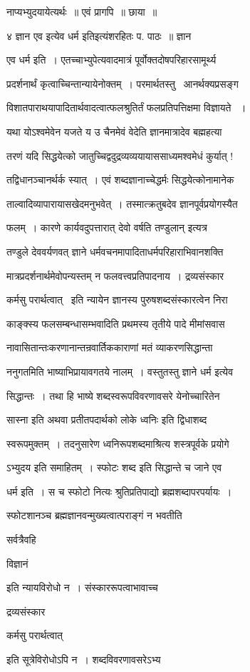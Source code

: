 \documentclass[11pt, openany]{book}
\begin{document}
नाप्यभ्युदयायेत्यर्थः~॥ एवं प्रागपि~॥ छाया~॥ 

४ {\qt ज्ञान एव} इत्येव धर्म इतिइत्यंशरहितः प. पाठः~॥ ज्ञान 

एव धर्म इति~। एतच्चाभ्युपेत्यवादमात्रं पूर्वोक्तदोषपरिहारसामूर्थ्य \textendash\ 

प्रदर्शनार्थं कृत्वाच्चिन्तान्यायेनोक्तम्~। 
परमार्थतस्तु \textendash\ आनर्थक्यप्रसङ्ग \textendash\ 

विशातपाराथयापादितार्थवादत्वात्फलश्रुतिर्तं फलप्रतिपत्तिक्षमा विज्ञायते
~। 

यथा योऽश्वमेवेन यजते य उ चैनमेवं वेदेति ज्ञानमात्रादेव बह्महत्या \textendash\ 

तरणं यदि सिद्धयेत्को जातुच्चिद्वदुद्रव्यव्ययायाससाध्यमश्वमेधं कुर्यात्
! 

तद्विधानञ्चानर्थर्क स्यात्~। एवं शब्दज्ञानाच्चेद्धर्मः
सिद्धयेत्कोनामानेक \textendash\ 

ताल्वादिव्यापारायासखेदमनुभवेत्~। तस्मात्क्रतुबदेव ज्ञानपूर्वप्रयोगस्यैत


फलम्~। कारणे कार्यवदुपत्तारात् {\qt देवो वर्षति तण्डुलान्} इत्यत्र 

तण्डुले देववर्यणवत् ज्ञाने धर्मवचनमापादिताधर्मपरिहाराभिवानशक्ति \textendash\ 

मात्रप्रदर्शनार्थमेवोपन्यस्तम् न फलवत्त्वप्रतिपादनाय~। द्रव्यसंस्कार \textendash\ 


कर्मसु परार्थत्वात् \textendash\ इति न्यायेन ज्ञानस्य पुरुषशब्दसंस्कारत्वेन निरा \textendash\ 

काङ्क्स्य फलसम्बन्धासम्भवादिति प्रथमस्य तृतीये पादे मीमांसवास \textendash\ 

नावासितान्तःकरणानान्तन्रवार्तिककाराणां मतं व्याकरणसिद्धान्ता \textendash\ 

ननुगतमिति भाष्याभिप्रायावगतये नालम्~। वस्तुतस्तु ज्ञाने धर्म इत्येव 

सिद्धान्तः~। तथा हि भाष्ये शब्दस्वरूपविवरणावसरे येनोच्चारितेन 

{\qt सास्ना} इति अथवा {\qt प्रतीतपदार्थको लोके ध्वनिः} इति द्विधाशब्द \textendash\ 

स्वरूपमुक्तम्~। तदनुसारेण ध्वनिरूपशब्दमाश्रित्य शस्त्रपूर्वके प्रयोगे \textendash\ 


ऽभ्युदय इति समाहितम्~। स्फोटः शब्द इति सिद्धान्ते च जाने एव 

धर्म इति~। स च स्फोटो नित्यः श्रुतिप्रतिपाद्यो ब्रह्मशब्दापरपर्यायः~। 

स्फोटशानञ्च ब्रह्मज्ञानवन्मुख्यत्वात्पराङ्गं न भवतीति {\qt सर्वत्रैवहि 

विज्ञानं} इति न्यायविरोधो न~। संस्काररूपत्वाभावाच्च {\qt द्रव्यसंस्कार \textendash\ 

कर्मसु परार्थत्वात्} इति सूत्रेविरोधोऽपि न~। शब्दविवरणावसरेऽभ्य \textendash\ 
\end{document}
